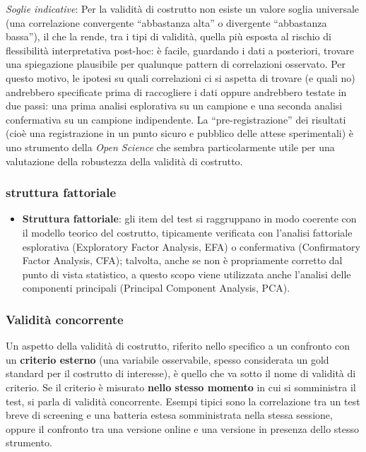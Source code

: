 \documentclass[
  italian,
  letterpaper,
  paper=6in:9in,
  pagesize=pdftex,
  headinclude=on,
  footinclude=on,
  11pt]{scrbook}
\providecommand{\tightlist}{%
  \setlength{\itemsep}{0pt}\setlength{\parskip}{0pt}}
\begin{document}
\emph{Soglie indicative}: Per la validità di costrutto non esiste un
valore soglia universale (una correlazione convergente ``abbastanza
alta'' o divergente ``abbastanza bassa''), il che la rende, tra i tipi
di validità, quella più esposta al rischio di flessibilità
interpretativa post-hoc: è facile, guardando i dati a posteriori,
trovare una spiegazione plausibile per qualunque pattern di correlazioni
osservato. Per questo motivo, le ipotesi su quali correlazioni ci si
aspetta di trovare (e quali no) andrebbero specificate prima di
raccogliere i dati oppure andrebbero testate in due passi: una prima
analisi esplorativa su un campione e una seconda analisi confermativa su
un campione indipendente. La ``pre-registrazione'' dei risultati (cioè
una registrazione in un punto sicuro e pubblico delle attese
sperimentali) è uno strumento della \emph{Open Science} che sembra
particolarmente utile per una valutazione della robustezza della
validità di costrutto.

\subsubsection{struttura fattoriale}\label{struttura-fattoriale}

\begin{itemize}
\tightlist
\item
  \textbf{Struttura fattoriale}: gli item del test si raggruppano in
  modo coerente con il modello teorico del costrutto, tipicamente
  verificata con l'analisi fattoriale esplorativa (Exploratory Factor
  Analysis, EFA) o confermativa (Confirmatory Factor Analysis, CFA);
  talvolta, anche se non è propriamente corretto dal punto di vista
  statistico, a questo scopo viene utilizzata anche l'analisi delle
  componenti principali (Principal Component Analysis, PCA).
\end{itemize}

\subsubsection{Validità concorrente}\label{validituxe0-concorrente}

Un aspetto della validità di costrutto, riferito nello specifico a un
confronto con un \textbf{criterio esterno} (una variabile osservabile,
spesso considerata un gold standard per il costrutto di interesse), è
quello che va sotto il nome di validità di criterio. Se il criterio è
misurato \textbf{nello stesso momento} in cui si somministra il test, si
parla di validità concorrente. Esempi tipici sono la correlazione tra un
test breve di screening e una batteria estesa somministrata nella stessa
sessione, oppure il confronto tra una versione online e una versione in
presenza dello stesso strumento.
\end{document}
